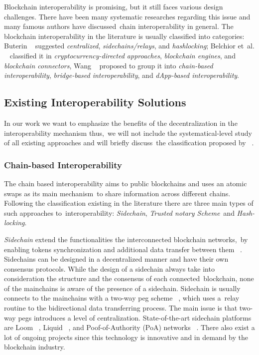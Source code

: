 Blockchain interoperability is promising, but it still faces various design
challenges.
There have been many systematic researches regarding this issue and many famous authors have discussed\
chain interoperability in general.
The blockchain interoperability in the literature is usually classified into categories: Buterin ~\cite{buterin2016}
suggested \emph{centralized}, \emph{sidechains/relays}, and \emph{hashlocking}; Belchior et\
al. ~\cite{belchior2021survey} classified it in \emph{cryptocurrency-directed approaches}, \emph{blockchain engines}, and \emph{blockchain connectors},
Wang ~\cite{cryptoeprint:2021/537} proposed to group it into \emph{chain-based interoperability},
\emph{bridge-based interoperability}, and \emph{dApp-based interoperability}.

\subsection{Existing Interoperability Solutions}\label{subsec:interoperability-categories}
In our work we want to emphasize the benefits of the decentralization in the interoperability mechanism thus,\
we will not include the systematical-level study of all existing approaches and will briefly discuss\
the classification proposed by ~\cite{cryptoeprint:2021/537}.

\subsubsection{Chain-based Interoperability}
The chain based interoperability aims to public blockchains and uses an atomic swaps as its main mechanism\
to share information across different chains.
Following the classification existing in the literature there are three main types of such approaches to\
interoperability: \emph{Sidechain}, \emph{Trusted notary Scheme}\
and \emph{Hash-locking}.

\emph{Sidechain} extend the functionalities the interconnected blockchain networks,\
by enabling tokens synchronization and additional data transfer between them ~\cite{Parizi2019}.
Sidechains can be designed in a decentralized manner and have their own consensus protocols.
While the design of a sidechain always take into consideration the structure and the consensus of each connected\
blockchain, none of the mainchains is aware of the presence of a sidechain.
Sidechain is usually connects to the mainchains with a two-way peg scheme ~\cite{SINGH2020102471}, which uses a\
relay routine to the bidirectional data transferring process.
The main issue is that two-way pegs introduces a level of centralization.
State-of-the-art sidechain platforms are Loom ~\cite{Loom2019}, Liquid ~\cite{Nick2020LiquidAB},
and Poof-of-Authority (PoA) networks ~\cite{POA2018}.
There also exist a lot of ongoing projects since this technology is innovative and in demand by the blockchain industry.

